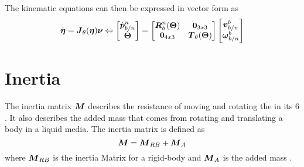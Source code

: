 The kinematic equations can then be expressed in vector form as 
\begin{equation} 
\dot{\boldsymbol{\eta}} = \boldsymbol{J}_\theta(\boldsymbol{\eta})\boldsymbol{\nu}
\Leftrightarrow
\begin{bmatrix}
\dot{\boldsymbol{p}}^n_{b/n} \\
\dot{\boldsymbol{\Theta}}
\end{bmatrix}
=
\begin{bmatrix}
\boldsymbol{R}^n_b(\boldsymbol{\Theta}) & \boldsymbol{0}_{3x3} \\
\boldsymbol{0}_{4x3} & \boldsymbol{T}_\theta(\boldsymbol{\Theta})
\end{bmatrix}
\begin{bmatrix}
\boldsymbol{v}^b_{b/n} \\
\boldsymbol{\omega}^b_{b/n}
\end{bmatrix}
\end{equation} 
\section{Inertia}
The inertia matrix $\boldsymbol{M}$ describes the resistance of moving and rotating the \abbrROV in its 6 \abbrDOF. It also describes the added mass that comes from rotating and translating a body in a liquid media. The inertia matrix is defined as
\begin{equation}
    \boldsymbol{M} = \boldsymbol{M}_{RB}+\boldsymbol{M}_{A}
\end{equation}
where $\boldsymbol{M}_{RB}$ is the inertia Matrix for a rigid-body and $\boldsymbol{M}_{A}$ is the added mass \citep{fossen2011}. 


